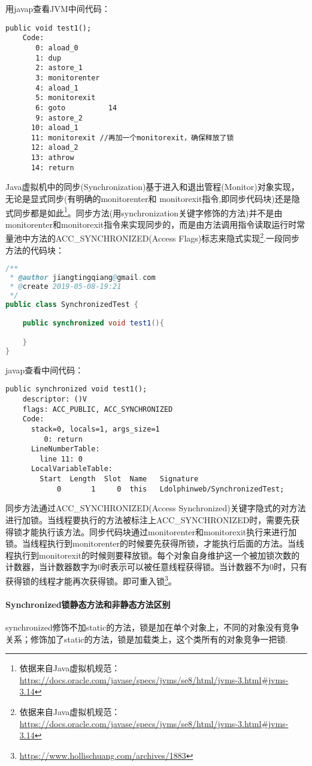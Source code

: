 \documentclass[../../../interview-questions.tex]{subfiles}
\begin{document}
用javap查看JVM中间代码：

\begin{lstlisting}
public void test1();
    Code:
       0: aload_0
       1: dup
       2: astore_1
       3: monitorenter
       4: aload_1
       5: monitorexit
       6: goto          14
       9: astore_2
      10: aload_1
      11: monitorexit //再加一个monitorexit，确保释放了锁
      12: aload_2
      13: athrow
      14: return
\end{lstlisting}

Java虚拟机中的同步(Synchronization)基于进入和退出管程(Monitor)对象实现，无论是显式同步(有明确的monitorenter和 monitorexit指令,即同步代码块)还是隐式同步都是如此\footnote{依据来自Java虚拟机规范：\url{https://docs.oracle.com/javase/specs/jvms/se8/html/jvms-3.html\#jvms-3.14}}。同步方法(用synchronization关键字修饰的方法)并不是由monitorenter和monitorexit指令来实现同步的，而是由方法调用指令读取运行时常量池中方法的ACC\_SYNCHRONIZED(Access Flags)标志来隐式实现\footnote{依据来自Java虚拟机规范：\url{https://docs.oracle.com/javase/specs/jvms/se8/html/jvms-3.html\#jvms-3.14}}.一段同步方法的代码块：

\begin{lstlisting}[language=Java]
/**
 * @author jiangtingqiang@gmail.com
 * @create 2019-05-08-19:21
 */
public class SynchronizedTest {

    public synchronized void test1(){

    }
}
\end{lstlisting}

javap查看中间代码：

\begin{lstlisting}
public synchronized void test1();
    descriptor: ()V
    flags: ACC_PUBLIC, ACC_SYNCHRONIZED
    Code:
      stack=0, locals=1, args_size=1
         0: return
      LineNumberTable:
        line 11: 0
      LocalVariableTable:
        Start  Length  Slot  Name   Signature
            0       1     0  this   Ldolphinweb/SynchronizedTest;
\end{lstlisting}

同步方法通过ACC\_SYNCHRONIZED(Access Synchronized)关键字隐式的对方法进行加锁。当线程要执行的方法被标注上ACC\_SYNCHRONIZED时，需要先获得锁才能执行该方法。同步代码块通过monitorenter和monitorexit执行来进行加锁。当线程执行到monitorenter的时候要先获得所锁，才能执行后面的方法。当线程执行到monitorexit的时候则要释放锁。每个对象自身维护这一个被加锁次数的计数器，当计数器数字为0时表示可以被任意线程获得锁。当计数器不为0时，只有获得锁的线程才能再次获得锁。即可重入锁\footnote{\url{https://www.hollischuang.com/archives/1883}}。

\paragraph{Synchronized锁静态方法和非静态方法区别}

synchronized修饰不加static的方法，锁是加在单个对象上，不同的对象没有竞争关系；修饰加了static的方法，锁是加载类上，这个类所有的对象竞争一把锁.
\end{document}
